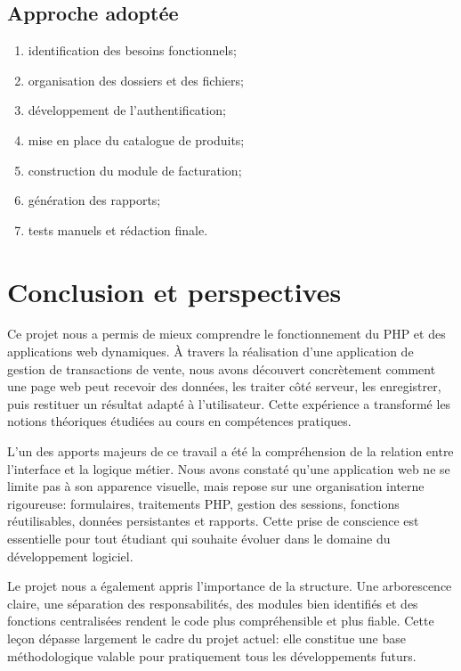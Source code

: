 \documentclass[12pt,a4paper]{article}
\begin{document}
\subsection{Approche adoptée}
\begin{enumerate}
  \item identification des besoins fonctionnels;
  \item organisation des dossiers et des fichiers;
  \item développement de l'authentification;
  \item mise en place du catalogue de produits;
  \item construction du module de facturation;
  \item génération des rapports;
  \item tests manuels et rédaction finale.
\end{enumerate}


\newpage

\section{Conclusion et perspectives}

Ce projet nous a permis de mieux comprendre le fonctionnement du PHP et des applications web dynamiques. À travers la réalisation d'une application de gestion de transactions de vente, nous avons découvert concrètement comment une page web peut recevoir des données, les traiter côté serveur, les enregistrer, puis restituer un résultat adapté à l'utilisateur. Cette expérience a transformé les notions théoriques étudiées au cours en compétences pratiques.

L'un des apports majeurs de ce travail a été la compréhension de la relation entre l'interface et la logique métier. Nous avons constaté qu'une application web ne se limite pas à son apparence visuelle, mais repose sur une organisation interne rigoureuse: formulaires, traitements PHP, gestion des sessions, fonctions réutilisables, données persistantes et rapports. Cette prise de conscience est essentielle pour tout étudiant qui souhaite évoluer dans le domaine du développement logiciel.

Le projet nous a également appris l'importance de la structure. Une arborescence claire, une séparation des responsabilités, des modules bien identifiés et des fonctions centralisées rendent le code plus compréhensible et plus fiable. Cette leçon dépasse largement le cadre du projet actuel: elle constitue une base méthodologique valable pour pratiquement tous les développements futurs.
\end{document}
